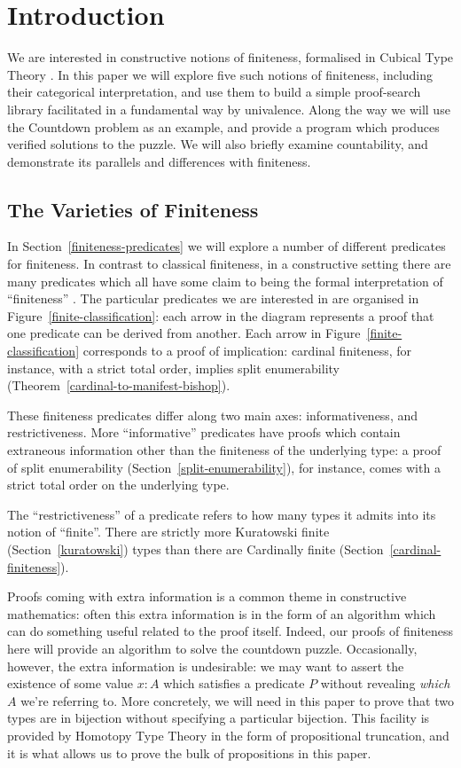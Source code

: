 \chapter{Introduction}
We are interested in constructive notions of finiteness, formalised in Cubical
Type Theory \cite{cohenCubicalTypeTheory2016}.
In this paper we will explore five such notions of finiteness, including their
categorical interpretation, and use them to build a simple proof-search library
facilitated in a fundamental way by univalence.
Along the way we will use the Countdown problem
\cite{huttonCountdownProblem2002} as an example, and provide a program which
produces verified solutions to the puzzle.
We will also briefly examine countability, and demonstrate its parallels and
differences with finiteness.
\section{The Varieties of Finiteness}
In Section~\ref{finiteness-predicates} we will explore a number of different
predicates for finiteness.
In contrast to classical finiteness, in a constructive setting there are many
predicates which all have some claim to being the formal interpretation of
``finiteness'' \cite{coquandConstructivelyFinite2010}.
The particular predicates we are interested in are organised in
Figure~\ref{finite-classification}: each arrow in the diagram represents a proof
that one predicate can be derived from another.
Each arrow in Figure~\ref{finite-classification} corresponds to a proof of
implication: cardinal finiteness, for instance, with a strict total order,
implies split enumerability (Theorem~\ref{cardinal-to-manifest-bishop}).



These finiteness predicates differ along two main axes: informativeness, and
restrictiveness.
More ``informative'' predicates have proofs which contain extraneous information
other than the finiteness of the underlying type: a proof of split enumerability
(Section~\ref{split-enumerability}), for instance, comes with a strict total
order on the underlying type.

The ``restrictiveness'' of a predicate refers to how many types it admits into
its notion of ``finite''.
There are strictly more Kuratowski finite (Section~\ref{kuratowski}) types than
there are Cardinally finite (Section~\ref{cardinal-finiteness}).

Proofs coming with extra information is a common theme in constructive
mathematics: often this extra information is in the form of an algorithm which
can do something useful related to the proof itself.
Indeed, our proofs of finiteness here will provide an algorithm to solve the
countdown puzzle.
Occasionally, however, the extra information is undesirable: we may want to
assert the existence of some value \(x : A\) which satisfies a predicate \(P\)
without revealing \emph{which} \(A\) we're referring to.
More concretely, we will need in this paper to prove that two types are in
bijection without specifying a particular bijection.
This facility is provided by Homotopy Type Theory \cite{hottbook} in the form of
propositional truncation, and it is what allows us to prove the bulk of
propositions in this paper.

